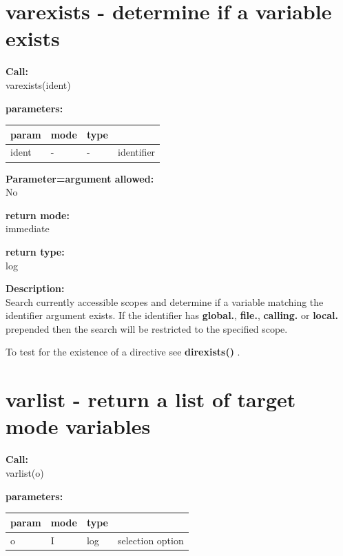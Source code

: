     \section{varexists - determine if a variable exists}\label{sec:ifvarexists}
        
        {\bf Call:} \\
        varexists(ident)
        
        {\bf parameters:} \\
        \begin{tabular}{| l | l | l | l |}
        \hline
        param  & mode & type & \\
        \hline \hline
        ident & - &  -  & identifier \\ \hline
        \end{tabular}
        
        {\bf Parameter=argument allowed:} \\
        No
        
        {\bf return mode:} \\
        immediate

        {\bf return type:} \\
        log
        
        {\bf Description:} \\
        Search currently accessible scopes and determine if a variable matching the
        identifier argument exists. If the identifier has {\bf global.}, {\bf
        file.}, {\bf calling.} or {\bf local.} prepended then the search will be
        restricted to the specified scope.
        
        To test for the existence of a directive
        see {\bf direxists()} .
        

        


    \section{varlist - return a list of target mode variables}\label{sec:ifvarlist}
        
        {\bf Call:} \\
        varlist(o)
        
        {\bf parameters:} \\
        \begin{tabular}{| l | l | l | l |}
        \hline
        param  & mode & type & \\
        \hline \hline
        o & I &  log  & selection option \\ \hline
        \end{tabular}
        
